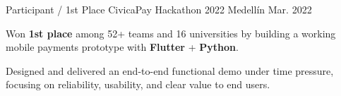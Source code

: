 
\begin{cventries}
  \cventry
  {Participant / 1st Place}
  {CivicaPay Hackathon 2022}
  {Medellín}
  {Mar. 2022}
  {
    \begin{cvitems}
      \item {Won \textbf{1st place} among 52+ teams and 16 universities by building a working mobile payments prototype with \textbf{Flutter} + \textbf{Python}.}
      \item {Designed and delivered an end-to-end functional demo under time pressure, focusing on reliability, usability, and clear value to end users.}
    \end{cvitems}
  }
\end{cventries}
